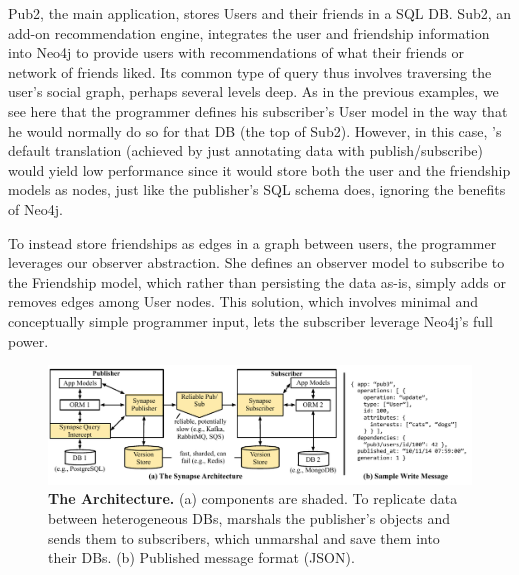 Pub2, the main application, stores Users and their friends in a SQL DB.
Sub2, an add-on recommendation engine, integrates the user and friendship
information into Neo4j to provide users with recommendations of what their
friends or network of friends liked. Its common type of query thus involves
traversing the user's social graph, perhaps several levels deep.  As in the
previous examples, we see here that the programmer defines his subscriber's User
model in the way that he would normally do so for that DB (the top of
Sub2).  However, in this case, \synapse's default translation (achieved by just
annotating data with publish/subscribe) would yield low performance since it
would store both the user and the friendship models as nodes, just like the
publisher's SQL schema does, ignoring the benefits of Neo4j.

To instead store friendships as edges in a graph between users, the programmer
leverages our observer abstraction.  She defines an observer model to
subscribe to the Friendship model, which rather than persisting the data as-is,
simply adds or removes edges among User nodes.  This solution, which involves
minimal and conceptually simple programmer input, lets the subscriber
leverage Neo4j's full power.

\begin{figure}[t+]
 \centering \includegraphics[width=.9\linewidth]{figures/synapse/architecture-less-detail.pdf} \vspace{-12pt}
 \caption{\small {{\bf The \synapse Architecture.}
   (a) \synapse components are shaded.  To replicate data between
       heterogeneous DBs, \synapse marshals the publisher's objects and
       sends them to subscribers, which unmarshal and save them into their
       DBs.  (b) Published message format (JSON).}}
 \label{fig:architecture}
 \vspace{-15pt}
\end{figure}

